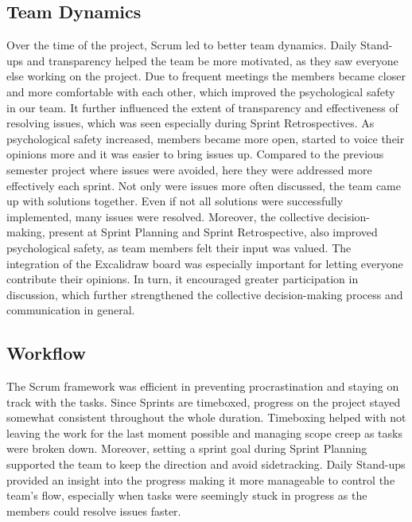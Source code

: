 \subsection*{Team Dynamics}
Over the time of the project, Scrum led to better team dynamics. Daily Stand-ups and transparency helped the team be more motivated, as they saw everyone else working on the project. Due to frequent meetings the members became closer and more comfortable with each other, which improved the psychological safety in our team. It further influenced the extent of transparency and effectiveness of resolving issues, which was seen especially during Sprint Retrospectives. As psychological safety increased, members became more open, started to voice their opinions more and it was easier to bring issues up. Compared to the previous semester project where issues were avoided, here they were addressed more effectively each sprint. Not only were issues more often discussed, the team came up with solutions together. Even if not all solutions were successfully implemented, many issues were resolved. Moreover, the collective decision-making, present at Sprint Planning and Sprint Retrospective, also improved psychological safety, as team members felt their input was valued. The integration of the Excalidraw board was especially important for letting everyone contribute their opinions. In turn, it encouraged greater participation in discussion, which further strengthened the collective decision-making process and communication in general. 

\subsection*{Workflow}
The Scrum framework was efficient in preventing procrastination and staying on track with the tasks. Since Sprints are timeboxed, progress on the project stayed somewhat consistent throughout the whole duration. Timeboxing helped with not leaving the work for the last moment possible and managing scope creep as tasks were broken down. Moreover, setting a sprint goal during Sprint Planning supported the team to keep the direction and avoid sidetracking. Daily Stand-ups provided an insight into the progress making it more manageable to control the team's flow, especially when tasks were seemingly stuck in progress as the members could resolve issues faster.

